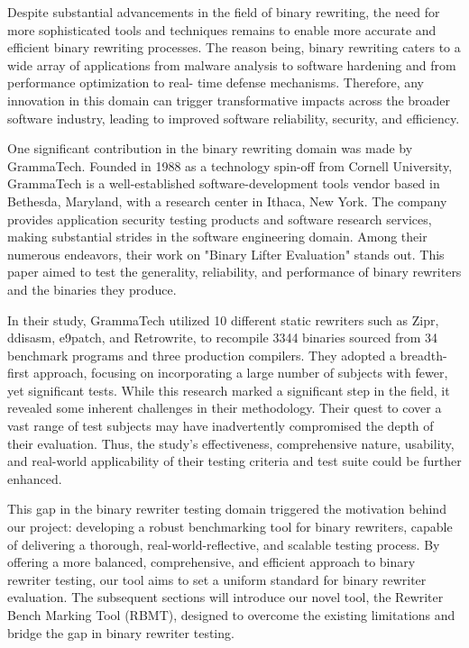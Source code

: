 \documentclass[a4paper,11pt,oneside]{report}
\begin{document}
Despite substantial advancements in the field of binary rewriting, the need for more
sophisticated tools and techniques remains to enable more accurate and efficient binary
rewriting processes. The reason being, binary rewriting caters to a wide array of applications
from malware analysis to software hardening and from performance optimization to real-
time defense mechanisms. Therefore, any innovation in this domain can trigger
transformative impacts across the broader software industry, leading to improved software
reliability, security, and efficiency.

One significant contribution in the binary rewriting domain was made by
GrammaTech. Founded in 1988 as a technology spin-off from Cornell University,
GrammaTech is a well-established software-development tools vendor based in Bethesda,
Maryland, with a research center in Ithaca, New York. The company provides application
security testing products and software research services, making substantial strides in the
software engineering domain. Among their numerous endeavors, their work on "Binary
Lifter Evaluation" stands out. This paper aimed to test the generality, reliability, and
performance of binary rewriters and the binaries they produce.

In their study, GrammaTech utilized 10 different static rewriters such as Zipr,
ddisasm, e9patch, and Retrowrite, to recompile 3344 binaries sourced from 34 benchmark
programs and three production compilers. They adopted a breadth-first approach, focusing
on incorporating a large number of subjects with fewer, yet significant tests. While this
research marked a significant step in the field, it revealed some inherent challenges in their
methodology. Their quest to cover a vast range of test subjects may have inadvertently
compromised the depth of their evaluation. Thus, the study's effectiveness, comprehensive
nature, usability, and real-world applicability of their testing criteria and test suite could be
further enhanced.

This gap in the binary rewriter testing domain triggered the motivation behind our
project: developing a robust benchmarking tool for binary rewriters, capable of delivering a
thorough, real-world-reflective, and scalable testing process. By offering a more balanced,
comprehensive, and efficient approach to binary rewriter testing, our tool aims to set a
uniform standard for binary rewriter evaluation. The subsequent sections will introduce our
novel tool, the Rewriter Bench Marking Tool (RBMT), designed to overcome the existing
limitations and bridge the gap in binary rewriter testing.
\end{document}

